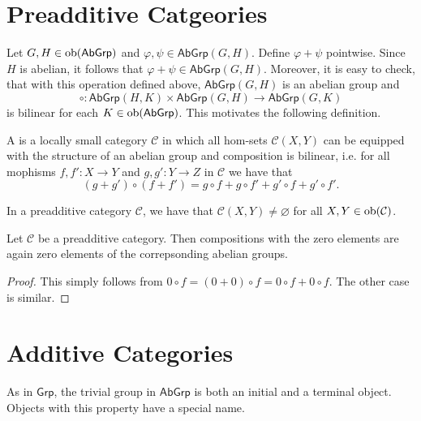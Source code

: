 \section{Preadditive Catgeories}
Let $G,H \in \operatorname{ob}(\mathsf{AbGrp})$ and $\varphi,\psi \in \mathsf{AbGrp}(G,H)$. Define $\varphi + \psi$ pointwise. Since $H$ is abelian, it follows that $\varphi + \psi \in \mathsf{AbGrp}(G,H)$. Moreover, it is easy to check, that with this operation defined above, $\mathsf{AbGrp}(G,H)$ is an abelian group and 
\begin{equation*}
	\circ : \mathsf{AbGrp}(H,K) \times \mathsf{AbGrp}(G,H) \to \mathsf{AbGrp}(G,K)
\end{equation*}
\noindent is bilinear for each $K \in \operatorname{ob}(\mathsf{AbGrp})$. This motivates the following definition. 

\begin{definition}
	A  is a locally small category $\mathcal{C}$ in which all hom-sets $\mathcal{C}(X,Y)$ can be equipped with the structure of an abelian group and composition is bilinear, i.e. for all mophisms $f,f' : X \to Y$ and $g,g' : Y \to Z$ in $\mathcal{C}$ we have that
	\begin{equation}
		(g + g') \circ (f + f') = g \circ f + g \circ f' + g' \circ f + g' \circ f'.
	\end{equation}
\end{definition}

\begin{remark}
	In a preadditive category $\mathcal{C}$, we have that $\mathcal{C}(X,Y) \neq \varnothing$ for all $X,Y \in \operatorname{ob}(\mathcal{C})$.
\end{remark}

\begin{lemma}
	\label{lem:composition_zero}
	Let $\mathcal{C}$ be a preadditive category. Then compositions with the zero elements are again zero elements of the correpsonding abelian groups.	
\end{lemma}

\begin{proof}
	This simply follows from $0 \circ f = (0 + 0) \circ f = 0 \circ f + 0 \circ f$. The other case is similar.
\end{proof}

\section{Additive Categories}
As in $\mathsf{Grp}$, the trivial group in $\mathsf{AbGrp}$ is both an initial and a terminal object. Objects with this property have a special name.

